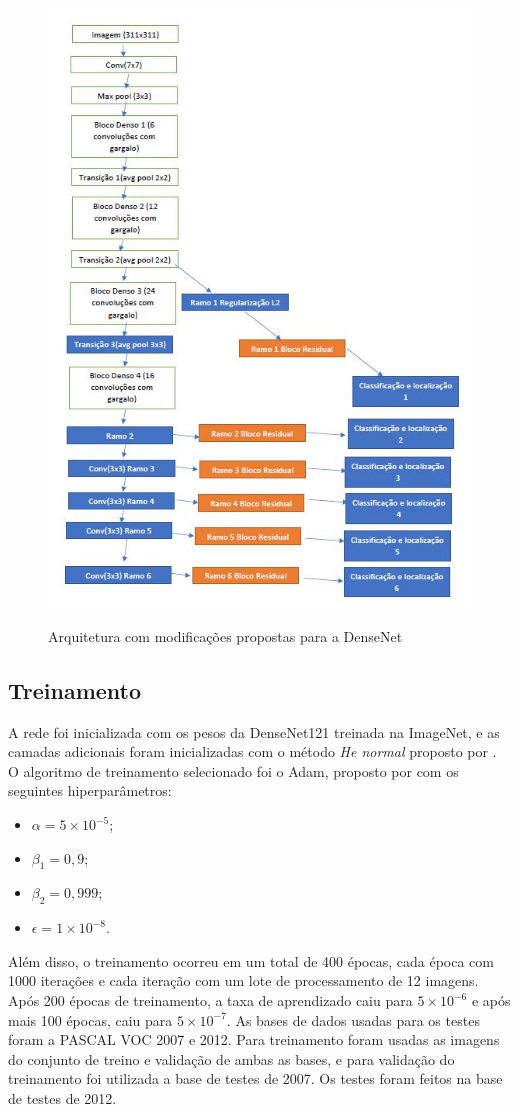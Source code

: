 \begin{figure}[H]
	\setlength{\abovecaptionskip}{0pt}
	\setlength{\belowcaptionskip}{0pt}
	\caption[Arquitetura proposta]{Arquitetura com modificações propostas para a \ac{DenseNet}}
	\centering
	\includegraphics[width=.6\textwidth]{imagem/0x_densenet_classloc.jpg}
	\captionsetup{justification=centering}
	\label{fig:dense_ssd}
\end{figure}


\subsection{Treinamento}
\label{secao:4:3:2}

A rede foi inicializada com os pesos da \ac{DenseNet}121 treinada na ImageNet, e as camadas adicionais foram inicializadas com o método \textit{He normal} proposto por . O algoritmo de treinamento selecionado foi o Adam, proposto por  com os seguintes hiperparâmetros:

\begin{itemize}
	\item $\alpha = 5\times10^{-5}$;
	\item $\beta_1 = 0,9$;
	\item $\beta_2 = 0,999$;
	\item $\epsilon = 1\times10^{-8}$.
\end{itemize}

Além disso, o treinamento ocorreu em um total de 400 épocas, cada época com 1000 iterações e cada iteração com um lote de processamento de 12 imagens. Após 200 épocas de treinamento, a taxa de aprendizado caiu para $5\times10^{-6}$ e após mais 100 épocas, caiu para $5\times10^{-7}$. As bases de dados usadas para os testes foram a \ac{PASCAL VOC} 2007 e 2012. Para treinamento foram usadas as imagens do conjunto de treino e validação de ambas as bases, e para validação do treinamento foi utilizada a base de testes de 2007. Os testes foram feitos na base de testes de 2012.